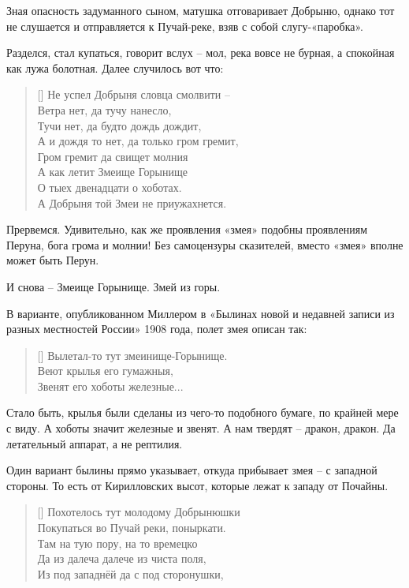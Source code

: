 Зная опасность задуманного сыном, матушка отговаривает Добрыню, однако тот не слушается и отправляется к Пучай-реке, взяв с собой слугу-«паробка».

Разделся, стал купаться, говорит вслух – мол, река вовсе не бурная, а спокойная как лужа болотная. Далее случилось вот что:

\settowidth{\versewidth}{А и дождя то нет, да только гром гремит,} 
\begin{verse}[\versewidth]
Не успел Добрыня словца смолвити – \\
Ветра нет, да тучу нанесло,\\
Тучи нет, да будто дождь дождит,\\
А и дождя то нет, да только гром гремит,\\
Гром гремит да свищет молния\\
А как летит Змеище Горынище\\
О тыех двенадцати о хоботах.\\
А Добрыня той Змеи не приужахнется.\\
\end{verse}

Прервемся. Удивительно, как же проявления «змея» подобны проявлениям Перуна, бога грома и молнии! Без самоцензуры сказителей, вместо «змея» вполне может быть Перун.

И снова – Змеище Горынище. Змей из горы.
   
В варианте, опубликованном Миллером в «Былинах новой и недавней записи из разных местностей России» 1908 года, полет змея описан так:

\settowidth{\versewidth}{Вылетал-то тут змеинище-Горынище.} 
\begin{verse}[\versewidth]
Вылетал-то тут змеинище-Горынище.\\
Веют крылья его гумажныя,\\
Звенят его хоботы железные...\\
\end{verse}

Стало быть, крылья были сделаны из чего-то подобного бумаге, по крайней мере с виду. А хоботы значит железные и звенят. А нам твердят – дракон, дракон. Да летательный аппарат, а не рептилия. 

Один вариант былины прямо указывает, откуда прибывает змея – с западной стороны. То есть от Кирилловских высот, которые лежат к западу от Почайны.

\settowidth{\versewidth}{Похотелось тут молодому Добрынюшки} 
\begin{verse}[\versewidth]
Похотелось тут молодому Добрынюшки\\
Покупаться во Пучай реки, поныркати.\\
Там на тую пору, на то времецко\\
Да из далеча далече из чиста поля,\\
Из под западнёй да с под сторонушки, \\
\end{verse}

